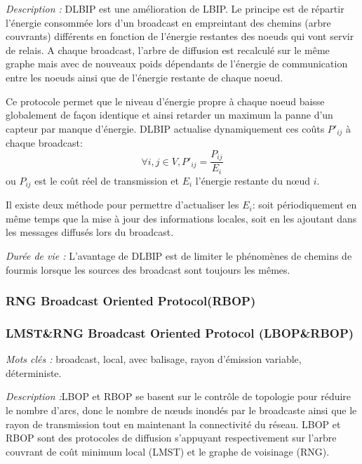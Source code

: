 \emph{Description :} DLBIP est une amélioration de LBIP. Le principe est de répartir l'énergie consommée lors 
d'un broadcast en empreintant des chemins (arbre couvrants) différents en fonction de l'énergie restantes des 
noeuds qui vont servir de relais. A chaque broadcast, l'arbre de diffusion est recalculé sur le même graphe mais
avec de nouveaux poids dépendants de l'énergie de communication entre les noeuds ainsi que de l'énergie restante
de chaque noeud.

Ce protocole permet que le niveau d'énergie propre à chaque noeud baisse globalement de façon identique et ainsi 
retarder un maximum la panne d'un capteur par manque d'énergie.
DLBIP actualise dynamiquement ces coûts $P'_{ij}$ à chaque broadcast:
$$ \forall i,j \in V, P'_{ij}=\frac{P_{ij}}{E_i}$$
ou $P_{ij}$ est le coût réel de transmission et $E_i$ l'énergie restante du nœud $i$.

Il existe deux méthode pour permettre d'actualiser les $E_i$: soit périodiquement en même temps que la mise à jour des informations locales, soit en les ajoutant dans les messages diffusés lors du broadcast.




\emph{Durée de vie :} L'avantage de DLBIP est de limiter le phénomènes de chemins de fourmis lorsque les sources des broadcast sont toujours les mêmes.







\subsubsection{ RNG Broadcast Oriented Protocol(RBOP) }





\subsubsection{LMST\&RNG Broadcast Oriented Protocol (LBOP\&RBOP)\cite{Cartigny2005}}

\emph{Mots clés :} broadcast, local, avec balisage, rayon d'émission variable, déterministe.

\emph{Description :}LBOP et RBOP se basent sur le contrôle de topologie pour réduire le nombre d'arcs, donc 
le nombre de nœuds inondés par le broadcaste ainsi que le rayon de transmission tout en maintenant la connectivité
du réseau. LBOP et RBOP sont des protocoles de diffusion s'appuyant respectivement sur l'arbre couvrant de 
coût minimum local (LMST) et le graphe de voisinage (RNG).\\

